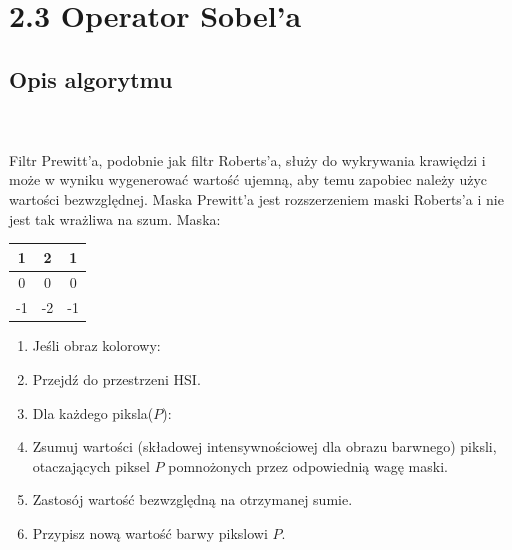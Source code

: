 \documentclass[final,a4paper,openany,12pt]{mwbk}
\begin{document}
\section*{2.3 Operator Sobel'a}
\subsection*{Opis algorytmu}
\hfill
\\\\
\indent Filtr Prewitt'a, podobnie jak filtr Roberts'a, służy do wykrywania krawiędzi i może w wyniku wygenerować wartość ujemną, aby temu zapobiec należy użyc wartości bezwzględnej. Maska Prewitt'a jest rozszerzeniem maski Roberts'a i nie jest tak wrażliwa na szum. Maska:

\begin{center}
	\begin{tabular}{|c|c|c|}
		\hline
		1 & 2 & 1\\
		\hline
		0 & 0 & 0\\
		\hline
		-1 & -2 & -1\\
		\hline
	\end{tabular}
\end{center}

\begin{enumerate}
	\item Jeśli obraz kolorowy:
	\item Przejdź do przestrzeni HSI.
	\item Dla każdego piksla($P$):
	\item Zsumuj wartości (składowej intensywnościowej dla obrazu barwnego) piksli, otaczających piksel $P$ pomnożonych przez odpowiednią wagę maski.
	\item Zastosój wartość bezwzględną na otrzymanej sumie.
	\item Przypisz nową wartość barwy pikslowi $P$.
\end{enumerate}
\end{document}

